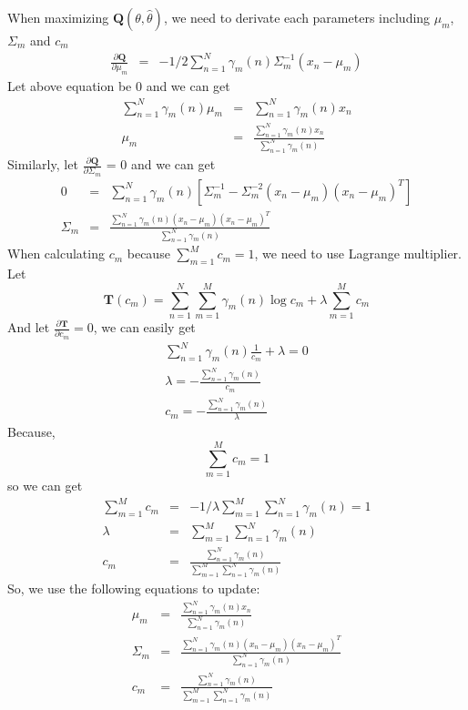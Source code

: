\documentclass[11pt, oneside]{article}   	%
\begin{document}
When maximizing $\mathbf{Q} (\theta, \hat{\theta})$, we need to derivate each parameters including $\mu_m$, $\Sigma_m$ and $c_m$
\begin{eqnarray}
\frac{\partial \mathbf{Q}}{\partial \mu_m} &=& -1/2 \sum_{n=1}^N \gamma_m(n) \Sigma_m^{-1} (x_n - \mu_m)
\end{eqnarray}
Let above equation be 0 and we can get
\begin{eqnarray}
\sum_{n=1}^N \gamma_m(n)  \mu_m  &=&  \sum_{n=1}^N \gamma_m(n) x_n \\
\mu_m &=& \frac{\sum_{n=1}^N \gamma_m(n) x_n}{\sum_{n=1}^N \gamma_m(n)}
\end{eqnarray}
Similarly, let $\frac{\partial \mathbf{Q}}{\partial \Sigma_m} $ = 0 and we can get
\begin{eqnarray}
0 &=& \sum_{n=1}^N \gamma_m(n) [ \Sigma_m^{-1} - \Sigma_m^{-2} (x_n - \mu_m)(x_n - \mu_m)^T ] \\
 \Sigma_m &=& \frac{\sum_{n=1}^N \gamma_m(n) (x_n - \mu_m)(x_n - \mu_m)^T }{\sum_{n=1}^N \gamma_m(n)}
\end{eqnarray}
When calculating $c_m$ because $\sum_{m=1}^M c_m = 1$, we need to use Lagrange multiplier. Let
\begin{equation}
\mathbf{T}(c_m) = \sum_{n=1}^N \sum_{m=1}^M \gamma_m(n) \log c_m + \lambda \sum_{m=1}^M c_m
\end{equation}
And let $\frac { \partial \mathbf{T} } {\partial c_m} = 0$, we can easily get
\begin{eqnarray}
\sum_{n=1}^N \gamma_m(n) \frac{1}{c_m} + \lambda = 0 \\
\lambda = -\frac{\sum_{n=1}^N \gamma_m(n)}{c_m} \\
c_m =  -\frac{\sum_{n=1}^N \gamma_m(n)}{\lambda}
\end{eqnarray}
Because,
\begin{equation}
\sum_{m=1}^M c_m = 1
\end{equation}
so we can get
\begin{eqnarray}
\sum_{m=1}^M c_m &=& -1/\lambda \sum_{m=1}^M \sum_{n=1}^N \gamma_m(n) = 1 \\
\lambda &=& \sum_{m=1}^M \sum_{n=1}^N \gamma_m(n)\\
c_m &=& \frac{ \sum_{n=1}^N \gamma_m(n) }{\sum_{m=1}^M \sum_{n=1}^N \gamma_m(n)}
\end{eqnarray}
So, we use the following equations to update:
\begin{eqnarray}
\mu_m &=& \frac{\sum_{n=1}^N \gamma_m(n) x_n}{\sum_{n=1}^N \gamma_m(n)} \\
 \Sigma_m &=& \frac{\sum_{n=1}^N \gamma_m(n) (x_n - \mu_m)(x_n - \mu_m)^T }{\sum_{n=1}^N \gamma_m(n)} \\
c_m &=& \frac{ \sum_{n=1}^N \gamma_m(n) }{\sum_{m=1}^M \sum_{n=1}^N \gamma_m(n)}
\end{eqnarray}
\end{document}
